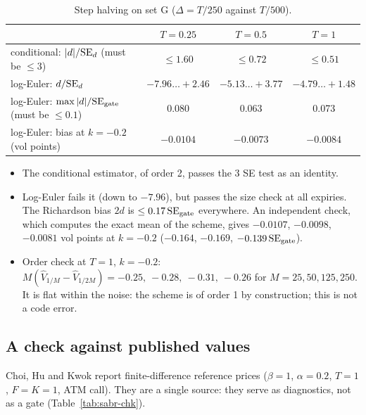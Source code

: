 \begin{table}[htbp]
\centering
\small
\caption{Step halving on set G ($\Delta=T/250$ against $T/500$).}
\label{tab:sabr-halving}
\begin{tabular*}{\textwidth}{@{\extracolsep{\fill}}lccc@{}}
\toprule
 & $T=0.25$ & $T=0.5$ & $T=1$\\
\midrule
conditional: $|d|/\mathrm{SE}_d$ (must be $\le3$) & $\le1.60$ & $\le0.72$ & $\le0.51$\\
log-Euler: $d/\mathrm{SE}_d$ & $-7.96\ldots+2.46$ & $-5.13\ldots+3.77$ & $-4.79\ldots+1.48$\\
log-Euler: $\max|d|/\mathrm{SE}_{\text{gate}}$ (must be $\le0.1$) & 0.080 & 0.063 & 0.073\\
log-Euler: bias at $k=-0.2$ (vol points) & $-0.0104$ & $-0.0073$ & $-0.0084$\\
\bottomrule
\end{tabular*}
\end{table}

\begin{itemize}
\item The conditional estimator, of order 2, passes the 3 SE test as an identity.
\item Log-Euler fails it (down to $-7.96$), but passes the size check at all expiries. The Richardson bias $2d$ is
$\le0.17\,\mathrm{SE}_{\text{gate}}$ everywhere. An independent check, which computes the exact mean of the scheme, gives
$-0.0107$, $-0.0098$, $-0.0081$ vol points at $k=-0.2$ ($-0.164$, $-0.169$, $-0.139\,\mathrm{SE}_{\text{gate}}$).
\item Order check at $T=1$, $k=-0.2$: $M(\hat V_{1/M}-\hat V_{1/2M})=-0.25,\ -0.28,\ -0.31,\ -0.26$ for
$M=25,50,125,250$. It is flat within the noise: the scheme is of order 1 by construction; this is not a code error.
\end{itemize}

\subsection{A check against published values}
Choi, Hu and Kwok report finite-difference reference prices ($\beta=1$, $\alpha=0.2$, $T=1$, $F=K=1$, ATM call). They
are a single source: they serve as diagnostics, not as a gate (Table~\ref{tab:sabr-chk}).

